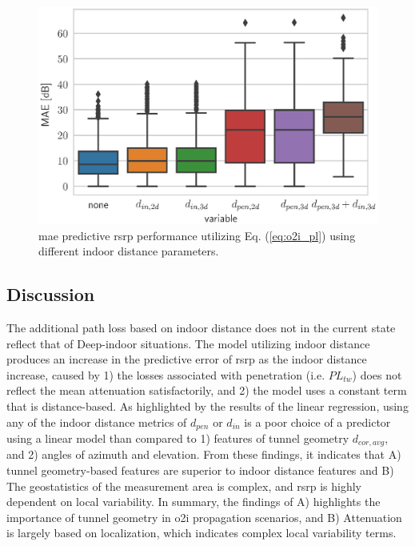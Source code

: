 \begin{figure}
    \centering
    \includegraphics{chapters/part_pathloss/figures/outdoor_to_indoor/results/mae_boxplot.eps}
    \caption{\gls{mae} predictive \gls{rsrp} performance utilizing Eq. (\ref{eq:o2i_pl}) using different indoor distance parameters.}
    \label{fig:mae_boxplot_o2i_pl_in}
\end{figure}

\subsection{Discussion}
The additional path loss based on indoor distance does not in the current state reflect that of Deep-indoor situations. The model utilizing indoor distance produces an increase in the predictive error of \gls{rsrp} as the indoor distance increase, caused by 1) the losses associated with penetration (i.e. $PL_{tw}$) does not reflect the mean attenuation satisfactorily, and 2) the model uses a constant term that is distance-based. As highlighted by the results of the linear regression, using any of the indoor distance metrics of $d_{pen}$ or $d_{in}$ is a poor choice of a predictor using a linear model than compared to 1) features of tunnel geometry $d_{cor,avg}$, and 2) angles of azimuth and elevation. From these findings, it indicates that A) tunnel geometry-based features are superior to indoor distance features and B) The geostatistics of the measurement area is complex, and \gls{rsrp} is highly dependent on local variability. In summary, the findings of A) highlights the importance of tunnel geometry in \gls{o2i} propagation scenarios, and B) Attenuation is largely based on localization, which indicates complex local variability terms.

